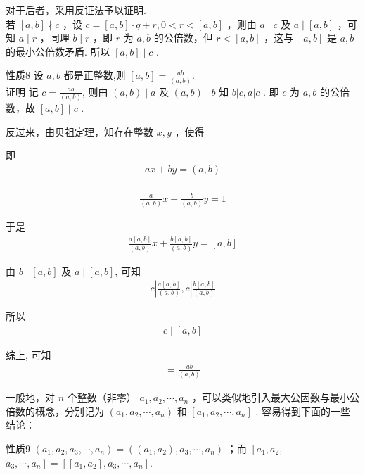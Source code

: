 对于后者，采用反证法予以证明. \\
若 $[a, b] \nmid c$ ，设 $c=[a, b] \cdot q+r, 0<r<[a, b]$ ，则由 $a \mid c$ 及 $a \mid[a, b]$ ，可知 $a \mid r$ ，同理 $b \mid r$ ，即 $r$ 为 $a ,  b$ 的公倍数，但 $r<[a, b]$ ，这与 $[a, b]$ 是 $a ,  b$ 的最小公倍数矛盾. 所以 $[a, b] \mid c$ . 

性质8 设 $a ,  b$ 都是正整数,则 $[a, b]=\frac{a b}{(a, b)}$.\\
证明 记 $c=\frac{a b}{(a, b)}$, 则由 $(a, b) \mid a$ 及 $(a, b) \mid b$ 知 $b|c, a| c$ . 即 $c$ 为 $a ,  b$ 的公倍数，故 $[a, b] \mid c$ . 

反过来，由贝祖定理，知存在整数 $x ,  y$ ，使得

即\\
\begin{align*}
a x+b y=(a, b)
\end{align*}\\
\begin{align*}
\frac{a}{(a, b)} x+\frac{b}{(a, b)} y=1
\end{align*}

于是\\
\begin{align*}
\frac{a[a, b]}{(a, b)} x+\frac{b[a, b]}{(a, b)} y=[a, b]
\end{align*}

由 $b \mid[a, b]$ 及 $a \mid[a, b]$, 可知\\
\begin{align*}
c\left|\frac{a[a, b]}{(a, b)}, c\right| \frac{b[a, b]}{(a, b)}
\end{align*}

所以\\
\begin{align*}
c \mid[a, b]
\end{align*}

综上, 可知\\
\begin{align*}
[a, b]=\frac{a b}{(a, b)}
\end{align*}

一般地，对 $n$ 个整数（非零） $a_{1}, a_{2}, \cdots, a_{n}$ ，可以类似地引入最大公因数与最小公倍数的概念，分别记为 $\left(a_{1}, a_{2}, \cdots, a_{n}\right)$ 和 $\left[a_{1}, a_{2}, \cdots, a_{n}\right]$ . 容易得到下面的一些结论：

性质9 $\left(a_{1}, a_{2}, a_{3}, \cdots, a_{n}\right)=\left(\left(a_{1}, a_{2}\right), a_{3}, \cdots, a_{n}\right)$ ；而 $\left[a_{1}, a_{2}\right.$, $\left.a_{3}, \cdots, a_{n}\right]=\left[\left[a_{1}, a_{2}\right], a_{3}, \cdots, a_{n}\right]$.

